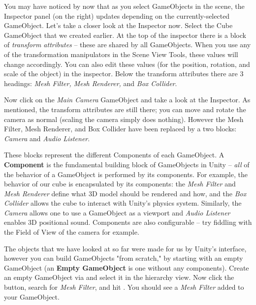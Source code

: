 \documentclass[11pt]{article}
\begin{document}
You may have noticed by now that as you select GameObjects in the scene, the Inspector panel (on the right) updates depending on the currently-selected GameObject.  Let's take a closer look at the Inspector now.  Select the Cube GameObject that we created earlier.  At the top of the inspector there is a block of \textit{transform attributes} -- these are shared by all GameObjects.  When you use any of the transformation manipulators in the Scene View Tools, these values will change accordingly.  You can also edit these values (for the position, rotation, and scale of the object) in the inspector.  Below the transform attributes there are 3 headings: \textit{Mesh Filter, Mesh Renderer,} and \textit{Box Collider}.

Now click on the \textit{Main Camera} GameObject and take a look at the Inspector.  As mentioned, the transform attributes are still there; you can move and rotate the camera as normal (scaling the camera simply does nothing).  However the Mesh Filter, Mesh Renderer, and Box Collider have been replaced by a two blocks: \textit{Camera} and \textit{Audio Listener}.

These blocks represent the different Components of each GameObject.  A \textbf{Component} is the fundamental building block of GameObjects in Unity -- \textit{all} of the behavior of a GameObject is performed by its components.  For example, the behavior of our cube is encapsulated by its components: the \textit{Mesh Filter} and \textit{Mesh Renderer} define what 3D model should be rendered and how, and the \textit{Box Collider} allows the cube to interact with Unity's physics system.  Similarly, the \textit{Camera} allows one to use a GameObject as a viewport and \textit{Audio Listener} enables 3D positional sound.  Components are also configurable -- try fiddling with the Field of View of the camera for example.

The objects that we have looked at so far were made for us by Unity's interface, however you can build GameObjects "from scratch," by starting with an empty GameObject (an \textbf{Empty GameObject} is one without any components).  Create an empty GameObject via  and select it in the hierarchy view.  Now click the  button, search for \textit{Mesh Filter}, and hit .  You should see a \textit{Mesh Filter} added to your GameObject.  
\end{document}
